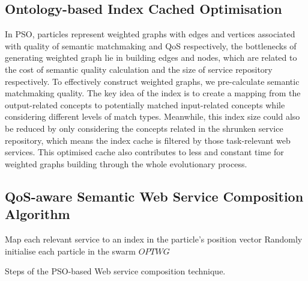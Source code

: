 \documentclass{IEEEtran}
\begin{document}
\subsection{Ontology-based Index Cached Optimisation}\label{indexCache}
In PSO, particles represent weighted graphs with edges and vertices associated with quality of semantic matchmaking and QoS respectively, the bottlenecks of generating weighted graph lie in building edges and nodes, which are related to the cost of semantic quality calculation and the size of service repository respectively. To effectively construct weighted graphs, we pre-calculate semantic matchmaking quality. The key idea of the index is to create a mapping from the output-related concepts to potentially matched input-related concepts while considering different levels of match types. Meanwhile, this index size could also be reduced by only considering the concepts related in the shrunken service repository, which means the index cache is filtered by those task-relevant web services. This optimised cache also contributes to less and constant time for weighted graphs building through the whole evolutionary process.


\subsection{QoS-aware Semantic Web Service Composition Algorithm} \label{pso_algorithm}


\begin{algorithm}
 \setlength{}
 \LinesNumbered
 \SetNlSty{}{}{:}
 Map each relevant service to an index in the particle's position vector\;
 Randomly initialise each particle in the swarm\;
 \KwRet $OPTWG$\;
 \caption{Steps of the PSO-based Web service composition technique.}
\label{novelSteps}
\end{algorithm} 
\end{document}
